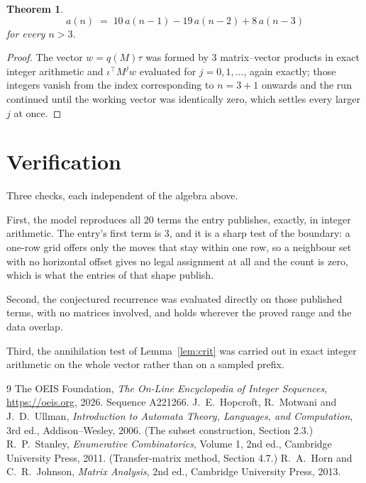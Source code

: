 \documentclass[11pt,a4paper]{article}
\theoremstyle{plain}
\newtheorem{theorem}{Theorem}
\theoremstyle{definition}
\begin{document}
\begin{theorem}
\[
a(n)\;=\;10\,a(n-1) - 19\,a(n-2) + 8\,a(n-3)
\]
for every $n>3$.
\end{theorem}

\begin{proof}
The vector $w=q(M)\tau$ was formed by $3$ matrix--vector products in exact integer
arithmetic and $\iota^{\!\top}M^{j}w$ evaluated for $j=0,1,\dots$, again exactly; those
integers vanish from the index corresponding to $n=3+1$ onwards and the run continued
until the working vector was identically zero, which settles every larger $j$ at once.
\end{proof}

\section{Verification}

Three checks, each independent of the algebra above.

First, the model reproduces all $20$ terms the entry publishes, exactly, in integer
arithmetic. The entry's first term is $3$, and it is a sharp test of the boundary: a
one-row grid offers only the moves that stay within one row, so a neighbour set with no
horizontal offset gives no legal assignment at all and the count is zero, which is what the
entries of that shape publish.

Second, the conjectured recurrence was evaluated directly on those published terms, with no
matrices involved, and holds wherever the proved range and the data overlap.

Third, the annihilation test of Lemma~\ref{lem:crit} was carried out in exact integer
arithmetic on the whole vector rather than on a sampled prefix.

\begin{thebibliography}{9}
 The OEIS Foundation, \emph{The On-Line Encyclopedia of Integer
Sequences}, \url{https://oeis.org}, 2026. Sequence A221266.
 J.~E.~Hopcroft, R.~Motwani and J.~D.~Ullman, \emph{Introduction to Automata
Theory, Languages, and Computation}, 3rd ed., Addison--Wesley, 2006. (The subset
construction, Section 2.3.)
 R.~P.~Stanley, \emph{Enumerative Combinatorics}, Volume 1, 2nd ed.,
Cambridge University Press, 2011. (Transfer-matrix method, Section 4.7.)
 R.~A.~Horn and C.~R.~Johnson, \emph{Matrix Analysis}, 2nd ed., Cambridge
University Press, 2013.
\end{thebibliography}
\end{document}
